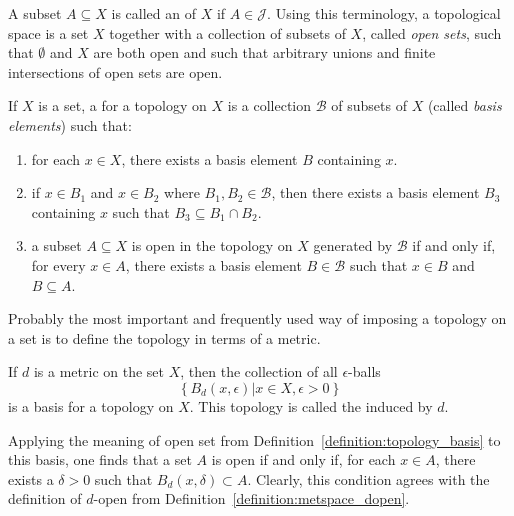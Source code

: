 A subset $A \subseteq X$ is called an  of $X$ if $A \in \mathcal{J}$.
Using this terminology, a topological space is a set $X$ together with a collection of subsets of $X$, called \emph{open sets}, such that $\emptyset$ and $X$ are both open and such that arbitrary unions and finite intersections of open sets are open.

\begin{definition}
\label{definition:topology_basis}
If $X$ is a set, a  for a topology on $X$ is a collection $\mathcal{B}$ of subsets of $X$ (called \emph{basis elements}) such that:
\begin{enumerate}
\item for each $x \in X$, there exists a basis element $B$ containing $x$.
\item if $x \in B_1$ and $x \in B_2$ where $B_1, B_2 \in \mathcal{B}$, then there exists a basis element $B_3$ containing $x$ such that $B_3 \subseteq B_1 \cap B_2$.
\item a subset $A \subseteq X$ is open in the topology on $X$ generated by $\mathcal{B}$ if and only if, for every $x \in A$, there exists a basis element $B \in \mathcal{B}$ such that $x \in B$ and $B \subseteq A$.
\end{enumerate}
\end{definition}


Probably the most important and frequently used way of imposing a topology on a set is to define the topology in terms of a metric.
\begin{example}
If $d$ is a metric on the set $X$, then the collection of all $\epsilon$-balls
\begin{equation*}
\left\{ B_d (x, \epsilon) |  x \in X, \epsilon > 0 \right\}
\end{equation*}
is a basis for a topology on $X$.
This topology is called the  induced by $d$.

Applying the meaning of open set from Definition~\ref{definition:topology_basis} to this basis, one finds that a set $A$ is open if and only if, for each $x \in A$, there exists a $\delta > 0$ such that $B_d (x, \delta) \subset A$.
Clearly, this condition agrees with the definition of $d$-open from Definition~\ref{definition:metspace_dopen}.
\end{example}

